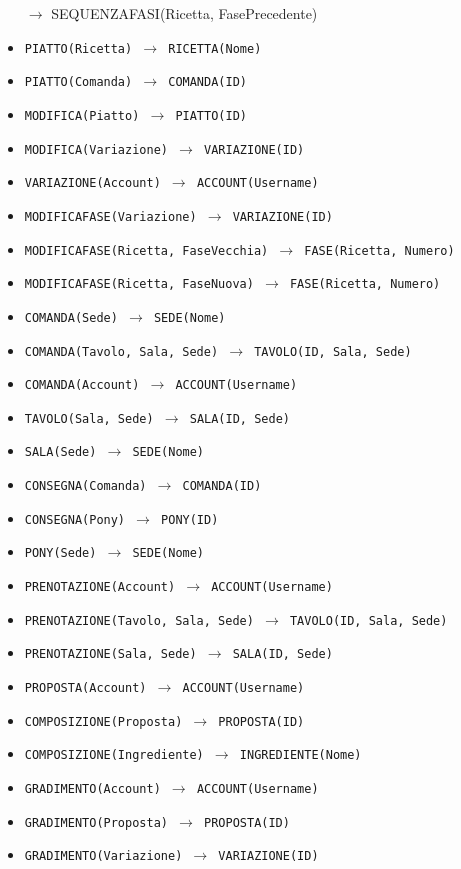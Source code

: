 \begin{itemize}[parsep=0pt,listparindent=9\parindent]
        $\rightarrow$ SEQUENZAFASI(Ricetta, FasePrecedente)
    \item\tt PIATTO(Ricetta) $\rightarrow$ RICETTA(Nome)
    \item\tt PIATTO(Comanda) $\rightarrow$ COMANDA(ID)
    \item\tt MODIFICA(Piatto) $\rightarrow$ PIATTO(ID)
    \item\tt MODIFICA(Variazione) $\rightarrow$ VARIAZIONE(ID)
    \item\tt VARIAZIONE(Account) $\rightarrow$ ACCOUNT(Username)
    \item\tt MODIFICAFASE(Variazione) $\rightarrow$ VARIAZIONE(ID)
    \item\tt MODIFICAFASE(Ricetta, FaseVecchia) $\rightarrow$ FASE(Ricetta, Numero)
    \item\tt MODIFICAFASE(Ricetta, FaseNuova) $\rightarrow$ FASE(Ricetta, Numero)
    \item\tt COMANDA(Sede) $\rightarrow$ SEDE(Nome)
    \item\tt COMANDA(Tavolo, Sala, Sede) $\rightarrow$ TAVOLO(ID, Sala, Sede)
    \item\tt COMANDA(Account) $\rightarrow$ ACCOUNT(Username)
    \item\tt TAVOLO(Sala, Sede) $\rightarrow$ SALA(ID, Sede)
    \item\tt SALA(Sede) $\rightarrow$ SEDE(Nome)
    \item\tt CONSEGNA(Comanda) $\rightarrow$ COMANDA(ID)
    \item\tt CONSEGNA(Pony) $\rightarrow$ PONY(ID)
    \item\tt PONY(Sede) $\rightarrow$ SEDE(Nome)
    \item\tt PRENOTAZIONE(Account) $\rightarrow$ ACCOUNT(Username)
    \item\tt PRENOTAZIONE(Tavolo, Sala, Sede) $\rightarrow$ TAVOLO(ID, Sala, Sede)
    \item\tt PRENOTAZIONE(Sala, Sede) $\rightarrow$ SALA(ID, Sede)
    \item\tt PROPOSTA(Account) $\rightarrow$ ACCOUNT(Username)
    \item\tt COMPOSIZIONE(Proposta) $\rightarrow$ PROPOSTA(ID)
    \item\tt COMPOSIZIONE(Ingrediente) $\rightarrow$ INGREDIENTE(Nome)
    \item\tt GRADIMENTO(Account) $\rightarrow$ ACCOUNT(Username)
    \item\tt GRADIMENTO(Proposta) $\rightarrow$ PROPOSTA(ID)
    \item\tt GRADIMENTO(Variazione) $\rightarrow$ VARIAZIONE(ID)

\end{itemize}
